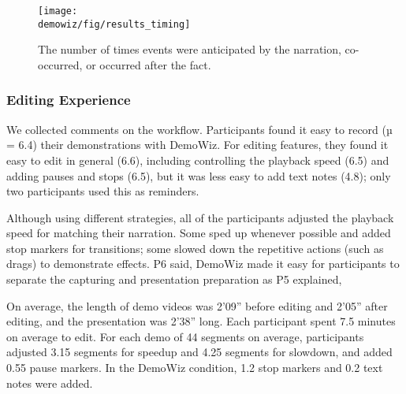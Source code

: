 \begin{figure*}[t]
  \centering
  \texttt{[image: \\demowiz/fig/results\_timing]}
  \caption{The number of times events were anticipated by the narration, co-occurred, or occurred after the fact.}
  \label{fig:demowiz_results_timing}
\end{figure*}

\subsubsection{Editing Experience}
We collected comments on the workflow. Participants found it easy to record (µ = 6.4) their demonstrations with DemoWiz. For editing features, they found it easy to edit in general (6.6), including controlling the playback speed (6.5) and adding pauses and stops (6.5), but it was less easy to add text notes (4.8); only two participants used this as reminders.

Although using different strategies, all of the participants adjusted the playback speed for matching their narration. Some sped up whenever possible and added stop markers for transitions; some slowed down the repetitive actions (such as drags) to demonstrate effects. P6 said,  DemoWiz made it easy for participants to separate the capturing and presentation preparation as P5 explained, 

On average, the length of demo videos was 2'09'' before editing and 2'05'' after editing, and the presentation was 2'38'' long. Each participant spent 7.5 minutes on average to edit. For each demo of 44 segments on average, participants adjusted 3.15 segments for speedup and 4.25 segments for slowdown, and added 0.55 pause markers. In the DemoWiz condition, 1.2 stop markers and 0.2 text notes were added.
